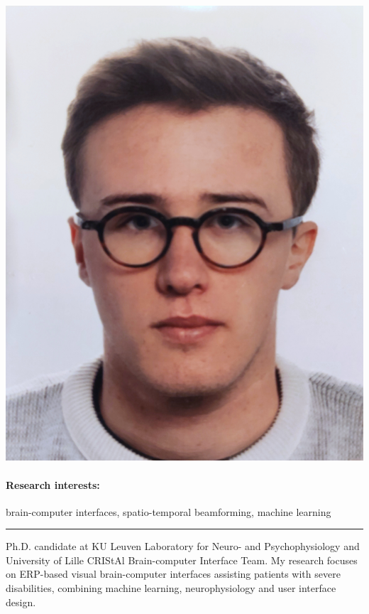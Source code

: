 \documentclass[10pt,a4paper]{article}
\begin{document}
    \begin{minipage}{.25\linewidth}
        \includegraphics[width=\linewidth]{photo.jpg}
    \end{minipage}

    \paragraph{Research interests:} brain-computer interfaces, spatio-temporal beamforming, machine learning


    \bigskip
    \hrule
    \bigskip

    Ph.D. candidate at KU Leuven Laboratory for Neuro- and Psychophysiology and University of Lille CRIStAl
    Brain-computer Interface Team. My research focuses on ERP-based visual brain-computer interfaces
    assisting patients with severe disabilities, combining machine learning, neurophysiology and
    user interface design.
\end{document}
